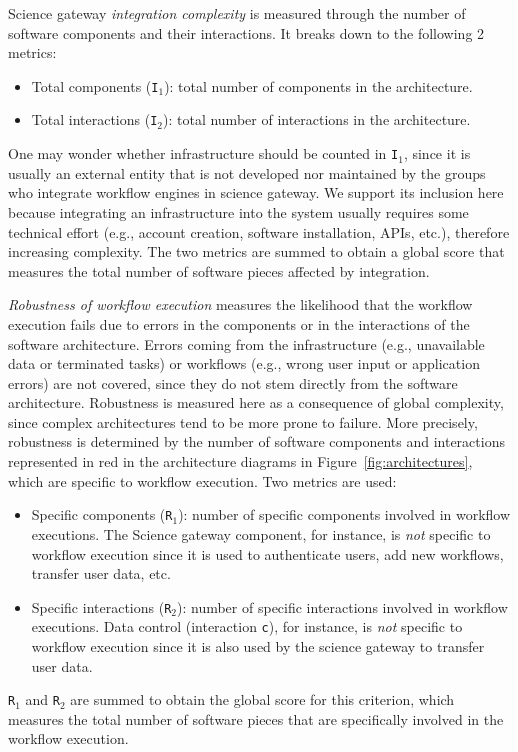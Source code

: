 \documentclass[preprint,3p,twocolumn]{elsarticle}
\begin{document}
Science gateway \emph{integration complexity} is measured through the number of software components and their interactions. It breaks
down to the following 2 metrics:
\begin{itemize}[leftmargin=0cm,itemindent=0.35cm,itemsep=0cm]
\item Total components (\texttt{I$_1$}): total number of components in
  the architecture.
\item Total interactions (\texttt{I$_2$}): total number of
  interactions in the architecture.
\end{itemize}
One may wonder whether infrastructure should be counted in
\texttt{I$_1$}, since it is usually an external entity that is not developed nor maintained by the groups who
integrate workflow engines in science gateway. We support its inclusion here because integrating an
infrastructure into the system usually requires some technical
effort (e.g., account creation, software installation, APIs, etc.), therefore increasing complexity. The two metrics are summed to obtain a
global score that measures the
total number of software pieces affected by integration. 

\emph{Robustness of workflow execution} measures the likelihood that the
workflow execution fails due to errors in the components or in the
interactions of the software architecture. Errors coming
from the infrastructure (e.g., unavailable data or terminated tasks)
or workflows (e.g., wrong user input or application errors) are not
covered, since they do not stem directly from the software
architecture. 
Robustness is measured here as a consequence of global
complexity, since complex architectures tend to be more prone to
failure. More precisely, robustness is determined by the number of
software components and interactions represented in
red in the architecture diagrams in
Figure~\ref{fig:architectures}, which are specific to workflow
execution. Two metrics are used:
\begin{itemize}[leftmargin=0cm,itemindent=0.35cm,itemsep=0cm]
\item Specific components  (\texttt{R$_1$}): number of specific components
involved in workflow executions. The Science
gateway component, for instance, is \emph{not} specific to workflow execution
since it is used to authenticate users, add new workflows, transfer
user data, etc.
\item Specific interactions (\texttt{R$_2$}): number of specific
  interactions involved in workflow executions. Data control
  (interaction \texttt{c}), for instance, is \emph{not} specific to
  workflow execution since it is also used by the science gateway to
  transfer user data. 
\end{itemize}
\texttt{R$_1$} and \texttt{R$_2$} are
summed to obtain the global score for this criterion, which measures
the total number of software pieces that are specifically involved in
the workflow execution.
\end{document}
